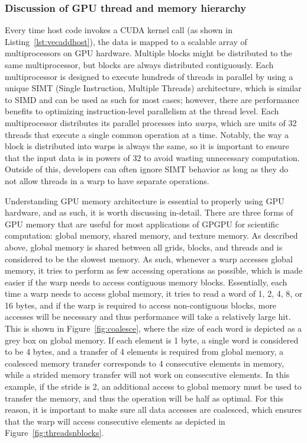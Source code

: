 \subsubsection{Discussion of GPU thread and memory hierarchy}

Every time host code invokes a CUDA kernel call (as shown in Listing~\ref{lst:vecaddhost}), the data is mapped to a scalable array of multiprocessors on GPU hardware.
Multiple blocks might be distributed to the same multiprocessor, but blocks are always distributed contiguously.
Each multiprocessor is designed to execute hundreds of threads in parallel by using a unique SIMT (Single Instruction, Multiple Threads) architecture, which is similar to SIMD and can be used as such for most cases; however, there are performance benefits to optimizing instruction-level parallelism at the thread level.
Each multiprocessor distributes its parallel processes into \textit{warps}, which are units of 32 threads that execute a single common operation at a time.
Notably, the way a block is distributed into warps is always the same, so it is important to ensure that the input data is in powers of 32 to avoid wasting unnecessary computation.
Outside of this, developers can often ignore SIMT behavior as long as they do not allow threads in a warp to have separate operations.

Understanding GPU memory architecture is essential to properly using GPU hardware, and as such, it is worth discussing in-detail.
There are three forms of GPU memory that are useful for most applications of GPGPU for scientific computation: global memory, shared memory, and texture memory.
As described above, global memory is shared between all grids, blocks, and threads and is considered to be the slowest memory.
As such, whenever a warp accesses global memory, it tries to perform as few accessing operations as possible, which is made easier if the warp needs to access contiguous memory blocks.
Essentially, each time a warp needs to access global memory, it tries to read a word of 1, 2, 4, 8, or 16 bytes, and
if the warp is required to access non-contiguous blocks, more accesses will be necessary and thus performance will take a relatively large hit.
This is shown in Figure~\ref{fig:coalesce}, where the size of each word is depicted as a grey box on global memory.
If each element is 1 byte, a single word is considered to be 4 bytes, and a transfer of 4 elements is required from global memory, a coalesced memory transfer corresponds to 4 consecutive elements in memory, while a strided memory transfer will not work on consecutive elements.
In this example, if the stride is 2, an additional access to global memory must be used to transfer the memory, and thus the operation will be half as optimal.
For this reason, it is important to make sure all data accesses are coalesced, which ensures that the warp will access consecutive elements as depicted in Figure~\ref{fig:threadsnblocks}.

